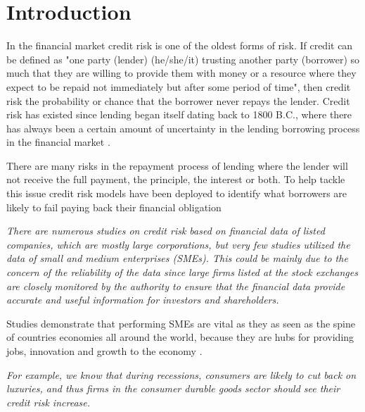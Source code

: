 
\chapter{Introduction} %

\label{Chapter1} %


In the financial market credit risk is one of the oldest forms of risk. If credit can be defined as "one party (lender) (he/she/it) trusting another party (borrower) so much that they are willing to provide them with money or a resource where they expect to be repaid not immediately but after some period of time", then credit risk the probability or chance that the borrower never repays the lender. Credit risk has existed since lending began itself dating back to 1800 B.C., where there has always been a certain amount of uncertainty in the lending borrowing process in the financial market \citep{caouette_managing_1998}.

There are many risks in the repayment process of lending where the lender will not receive the full payment, the principle, the interest or both. To help tackle this issue credit risk models have been deployed to identify what borrowers are likely to fail paying back their financial obligation \citep{sirirattanaphonkun_default_2012}

\textit{There  are  numerous  studies  on  credit 
	risk based on financial data of listed companies, which are mostly 
	large  corporations,  but  very  few  studies  utilized  the  data  of  small 
	and  medium  enterprises  (SMEs).  This  could  be  mainly  due  to  the 
	concern of the reliability of the data since large firms listed at the 
	stock  exchanges  are  closely  monitored  by  the  authority  to  ensure 
	that the financial data provide accurate and useful information for 
	investors and shareholders. \citep{sirirattanaphonkun_default_2012}}

Studies demonstrate that performing SMEs are vital as they as seen as the spine of countries economies all around the world, because they are hubs for providing jobs, innovation and growth to the economy \citep{craig_sba-guaranteed_2004}.


\textit{For example, we know that during recessions, consumers
	are likely to cut back on luxuries, and thus firms in the consumer durable goods sector
	should see their credit risk increase. \citep{hackbarth_capital_2006}}


